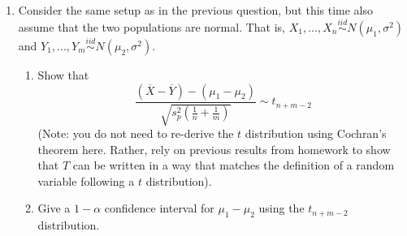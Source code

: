 \documentclass[11pt]{article}
\begin{document}
\begin{enumerate}
$$T = \frac{\overline{X} - \overline{Y}}{\sqrt{s_p^2 \left(\frac{1}{n} + \frac{1}{m} \right)}}$$

where 

$$s_p^2 = \dfrac{\sum \limits_{i=1}^n (X_i - \overline{X})^2 + \sum \limits_{j=1}^m (Y_j - \overline{Y})^2}{n+m-2}$$

\begin{enumerate}
\item Show that if $H_0$ is true and $\mu_1 = \mu_2 = \mu$, you can rewrite $T$ as

$$T = \left(\sqrt{1 - \lambda_{n,m}} \sqrt{n} (\overline{X} - \mu) - \sqrt{ \lambda_{n,m}} \sqrt{m} (\overline{Y} - \mu) \right)/s_p$$

where $\lambda_{n,m} = \dfrac{n}{n+m}$.

\item Suppose that $n,m \to \infty$ such that $\lambda_{n,m} \to \lambda \in (0, 1)$. Using the fact that

$$\frac{1}{n} \sum \limits_{i=1}^n (X_i - \overline{X})^2 \overset{p}{\to} \sigma^2 \hspace{1cm} \frac{1}{m} \sum \limits_{j=1}^m (Y_j - \overline{Y})^2 \overset{p}{\to} \sigma^2$$

show that $s_p^2 \overset{p}{\to} \sigma^2$.

\item Suppose that $H_0$ is true and $n,m \to \infty$ such that $\lambda_{n,m} \to \lambda \in (0, 1)$. Show that $T \overset{d}{\to} N(0, 1)$. For this, you may use the fact that if $\{U_n\}$ and $\{V_n\}$ are two independent sequences such that $U_n \overset{d}{\to} U$ and $V_n \overset{d}{\to} V$, and $U$ and $V$ are also independent, then $U_n + V_n \overset{d}{\to} U + V$.

\item Finally, give a Wald test rejection region for the test of $H_0: \mu_1 = \mu_2$ vs. $H_A: \mu_1 \neq \mu_2$ in terms of $T$.
\end{enumerate}

\bigskip

\item Consider the same setup as in the previous question, but this time also assume that the two populations are normal. That is, $X_1,...,X_n \overset{iid}{\sim} N(\mu_1, \sigma^2)$ and $Y_1,...,Y_m \overset{iid}{\sim} N(\mu_2, \sigma^2)$. 

\begin{enumerate}
\item Show that 
$$\dfrac{(\overline{X} - \overline{Y}) - (\mu_1 - \mu_2)}{\sqrt{s_p^2 \left(\frac{1}{n} + \frac{1}{m} \right)}} \sim t_{n+m-2}$$
(Note: you do not need to re-derive the $t$ distribution using Cochran's theorem here. Rather, rely on previous results from homework to show that $T$ can be written in a way that matches the definition of a random variable following a $t$ distribution).
\item Give a $1 - \alpha$ confidence interval for $\mu_1 - \mu_2$ using the $t_{n+m-2}$ distribution.
\end{enumerate}

\end{enumerate}
\end{document}

